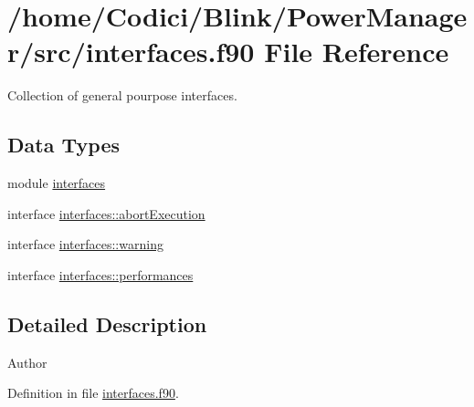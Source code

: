 \hypertarget{interfaces_8f90}{\section{/home/\-Codici/\-Blink/\-Power\-Manager/src/interfaces.f90 File Reference}
\label{interfaces_8f90}
}


Collection of general pourpose interfaces.  


\subsection*{Data Types}
\begin{DoxyCompactItemize}
\item 
module \hyperlink{classinterfaces}{interfaces}
\item 
interface \hyperlink{interfaceinterfaces_1_1abort_execution}{interfaces\-::abort\-Execution}
\item 
interface \hyperlink{interfaceinterfaces_1_1warning}{interfaces\-::warning}
\item 
interface \hyperlink{interfaceinterfaces_1_1performances}{interfaces\-::performances}
\end{DoxyCompactItemize}


\subsection{Detailed Description}
\begin{DoxyAuthor}{Author}

\end{DoxyAuthor}


Definition in file \hyperlink{interfaces_8f90_source}{interfaces.\-f90}.

